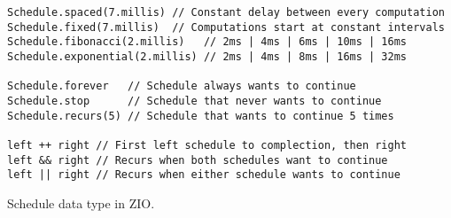 \begin{algorithm}

\begin{verbatim}
Schedule.spaced(7.millis) // Constant delay between every computation
Schedule.fixed(7.millis)  // Computations start at constant intervals
Schedule.fibonacci(2.millis)   // 2ms | 4ms | 6ms | 10ms | 16ms
Schedule.exponential(2.millis) // 2ms | 4ms | 8ms | 16ms | 32ms

Schedule.forever   // Schedule always wants to continue
Schedule.stop      // Schedule that never wants to continue
Schedule.recurs(5) // Schedule that wants to continue 5 times

left ++ right // First left schedule to complection, then right
left && right // Recurs when both schedules want to continue
left || right // Recurs when either schedule wants to continue
\end{verbatim}

\caption{Schedule data type in ZIO. \label{zio:schedule}}
\end{algorithm}